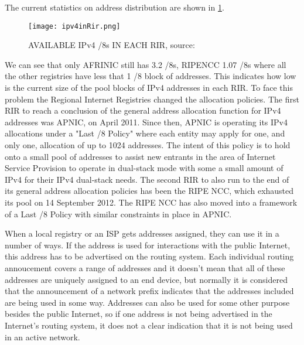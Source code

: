 \documentclass[11pt,a4paper]{scrreprt}
\begin{document}
The current statistics on address distribution are shown in \ref{fig:rirs_available_ipv4}.

\begin{figure}[!h]
\centering
\texttt{[image: ipv4inRir.png]}
\caption{AVAILABLE IPv4 /8s IN EACH RIR, source:\cite{IPv4_EACH_RIR}}
\label{fig:rirs_available_ipv4}
\end{figure}

We can see that only AFRINIC still has 3.2 /8s, RIPENCC 1.07 /8s where all the other registries have less that 1 /8 block of addresses. This indicates how low is the current size of the pool blocks of IPv4 addresses in each RIR. To face this problem the Regional Internet Registries changed the allocation policies. The first RIR to reach a conclusion of the general address allocation function for IPv4 addresses was APNIC, on April 2011. Since then, APNIC is operating its IPv4
allocations under a "Last /8 Policy" \cite{APNIC_last8} where each entity may apply for one, and only one, allocation of up to 1024 addresses. The intent of this policy is to hold onto a small pool of addresses to assist new entrants in the area of Internet Service Provision to operate in dual-stack mode with some a small amount of IPv4 for their IPv4 dual-stack needs. The second RIR to also run to the end of its general address allocation policies has been the RIPE NCC, which exhausted its pool on 14 September 2012. The RIPE NCC has also moved into a framework of a Last /8 Policy \cite{RIPE_last8} with similar constraints in place in APNIC. 

When a local registry or an ISP gets addresses assigned, they can use it in a number of ways. If the address is used for interactions with the public Internet, this address has to be advertised on the routing system. Each individual routing annoucement covers a range of addresses and it doesn't mean that all of these addresses are uniquely assigned to an end device, but normally it is considered that the announcement of a network prefix indicates that the addresses included are being used in some way. Addresses can also be used for some other purpose besides the public Internet, so if one address is not being advertised in the Internet's routing system, it does not a clear indication that it is not being used in an active network.
\end{document}
